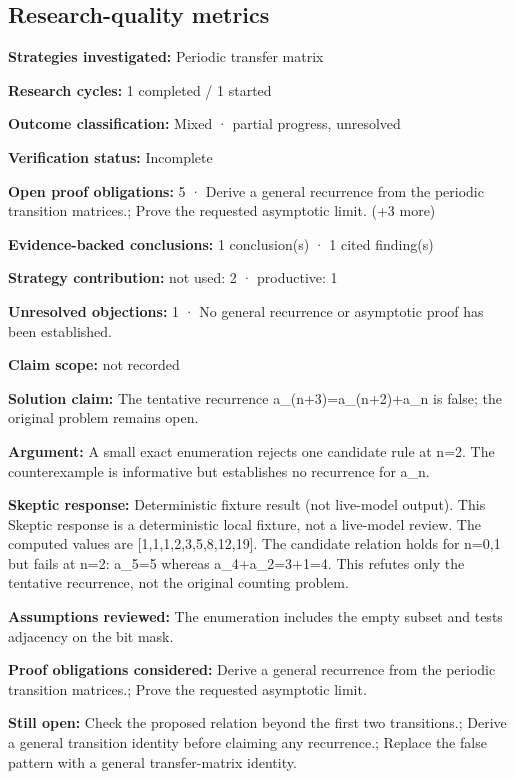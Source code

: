 \documentclass[11pt]{article}
\begin{document}
\subsection{Research-quality metrics}
\textbf{Strategies investigated:} Periodic transfer matrix\par
\textbf{Research cycles:} 1 completed / 1 started\par
\textbf{Outcome classification:} Mixed · partial progress, unresolved\par
\textbf{Verification status:} Incomplete\par
\textbf{Open proof obligations:} 5 · Derive a general recurrence from the periodic transition matrices.; Prove the requested asymptotic limit. (+3 more)\par
\textbf{Evidence-backed conclusions:} 1 conclusion(s) · 1 cited finding(s)\par
\textbf{Strategy contribution:} not used: 2 · productive: 1\par
\textbf{Unresolved objections:} 1 · No general recurrence or asymptotic proof has been established.\par
\textbf{Claim scope:} not recorded\par
\textbf{Solution claim:} The tentative recurrence a\_(n+3)=a\_(n+2)+a\_n is false; the original problem remains open.\par
\textbf{Argument:} A small exact enumeration rejects one candidate rule at n=2. The counterexample is informative but establishes no recurrence for a\_n.\par
\textbf{Skeptic response:} Deterministic fixture result (not live-model output). This Skeptic response is a deterministic local fixture, not a live-model review. The computed values are [1,1,1,2,3,5,8,12,19]. The candidate relation holds for n=0,1 but fails at n=2: a\_5=5 whereas a\_4+a\_2=3+1=4. This refutes only the tentative recurrence, not the original counting problem.\par
\textbf{Assumptions reviewed:} The enumeration includes the empty subset and tests adjacency on the bit mask.\par
\textbf{Proof obligations considered:} Derive a general recurrence from the periodic transition matrices.; Prove the requested asymptotic limit.\par
\textbf{Still open:} Check the proposed relation beyond the first two transitions.; Derive a general transition identity before claiming any recurrence.; Replace the false pattern with a general transfer-matrix identity.\par
\end{document}
